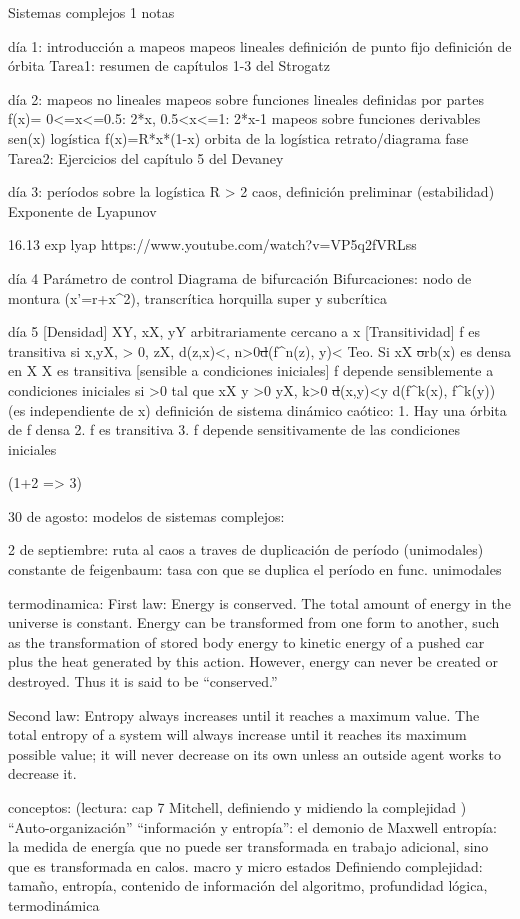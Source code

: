 Sistemas complejos 1
notas

día 1:
introducción a mapeos
mapeos lineales
definición de punto fijo
definición de órbita
Tarea1: resumen de capítulos 1-3 del Strogatz

día 2:
mapeos no lineales
mapeos sobre funciones lineales definidas por partes f(x)={ 0<=x<=0.5: 2*x, 0.5<x<=1: 2*x-1}
mapeos sobre funciones derivables sen(x)
logística f(x)=R*x*(1-x)
orbita de la logística
retrato/diagrama fase
Tarea2: Ejercicios del capítulo 5 del Devaney


día 3:
períodos sobre la logística
R > 2
caos, definición preliminar (estabilidad)
Exponente de Lyapunov

16.13 exp lyap https://www.youtube.com/watch?v=VP5q2fVRLss

día 4
Parámetro de control
Diagrama de bifurcación
Bifurcaciones: nodo de montura (x'=r+x^2), 
transcrítica
horquilla super y subcrítica

día 5
[Densidad] X\subset Y, \forall x\in X, \exists y\in Y arbitrariamente cercano a x
[Transitividad] f es transitiva si \forall x,y\in X, \forall\epsilon > 0, \exists z\in X, d(z,x)<\epsilon, \exists n>0\st d(f^{n}(z), y)<\epsilon
Teo. Si \exists x\in X \st orb(x) es densa en X \iff X es transitiva
[sensible a condiciones iniciales] f depende sensiblemente a condiciones iniciales si \exists \delta>0 tal que \forall x\in X y \forall \epsilon>0 \exists y\in X, \exists k>0 \st d(x,y)<\epsilon y d(f^{k}(x), f^{k}(y))\geq \delta
(\delta es independiente de x)
definición de sistema dinámico caótico: 
1. Hay una órbita de f densa
2. f es transitiva
3. f depende sensitivamente de las condiciones iniciales

(1+2 => 3)

30 de agosto:
modelos de sistemas complejos:

2 de septiembre:
ruta al caos a traves de duplicación de período (unimodales)
constante de feigenbaum: tasa con que se duplica el período en func. unimodales

termodinamica:
First law: Energy is conserved. The total amount of energy in the universe is constant. Energy can be transformed from one form to another, such as the transformation of stored body energy to kinetic energy of a pushed car plus the heat generated by this action. However, energy can never be created or destroyed. Thus it is said to be “conserved.”

Second law: Entropy always increases until it reaches a maximum value. The total entropy of a system will always increase until it reaches its maximum possible value; it will never decrease on its own unless an outside agent works to decrease it.

conceptos: (lectura: cap 7 Mitchell, definiendo y midiendo la complejidad )
``Auto-organización''
``información y entropía'': el demonio de Maxwell
entropía: la medida de energía que no puede ser transformada en trabajo adicional, sino que es transformada en calos.
macro y micro estados
Definiendo complejidad:
tamaño, entropía, contenido de información del algoritmo, profundidad {lógica, termodinámica}
